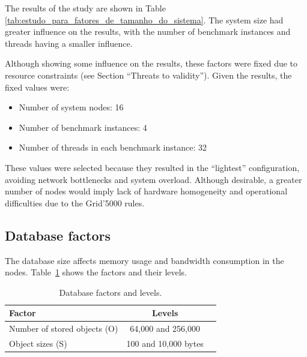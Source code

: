 \documentclass[man,floatsintext,12pt]{apa6}
\begin{document}
The results of the study are shown in Table
\ref{tab:estudo_para_fatores_de_tamanho_do_sistema}. The system size had
greater influence on the results, with the number of benchmark instances and
threads having a smaller influence.

Although showing some influence on the results, these factors were fixed due to
resource constraints (see Section ``Threats to validity''). Given the results,
the fixed values were:

\begin{itemize}

\item Number of system nodes: 16

\item Number of benchmark instances: 4

\item Number of threads in each benchmark instance: 32

\end{itemize}

These values were selected because they resulted in the ``lightest''
configuration, avoiding network bottlenecks and system overload. Although
desirable, a greater number of nodes would imply lack of hardware homogeneity
and operational difficulties due to the Grid'5000 rules.

\subsection{Database factors}

The database size affects memory usage and bandwidth consumption in the nodes.
Table~\ref{tab:database_factors_and_levels} shows the factors and their levels.

\begin{table}[h!]
\caption{Database factors and levels.}
\label{tab:database_factors_and_levels}
\begin{tabular}{lcc} \toprule

Factor & Levels \\ \midrule

Number of stored objects (O) & 64,000 and 256,000\\

Object sizes (S) & 100 and 10,000 bytes \\ \bottomrule

\end{tabular}  
\end{table}
\end{document}
